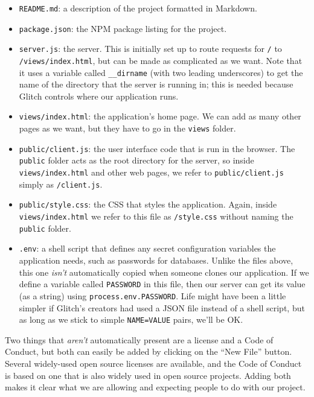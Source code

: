\begin{itemize}
\item
  \texttt{README.md}: a description of the project formatted in Markdown.
\item
  \texttt{package.json}: the NPM package listing for the project.
\item
  \texttt{server.js}: the server.
  This is initially set up to route requests for \texttt{/} to \texttt{/views/index.html},
  but can be made as complicated as we want.
  Note that it uses a variable called \texttt{\_\_dirname} (with two leading underscores)
  to get the name of the directory that the server is running in;
  this is needed because Glitch controls where our application runs.
\item
  \texttt{views/index.html}: the application's home page.
  We can add as many other pages as we want,
  but they have to go in the \texttt{views} folder.
\item
  \texttt{public/client.js}: the user interface code that is run in the browser.
  The \texttt{public} folder acts as the root directory for the server,
  so inside \texttt{views/index.html} and other web pages,
  we refer to \texttt{public/client.js} simply as \texttt{/client.js}.
\item
  \texttt{public/style.css}: the CSS that styles the application.
  Again,
  inside \texttt{views/index.html} we refer to this file as \texttt{/style.css}
  without naming the \texttt{public} folder.
\item
  \texttt{.env}: a shell script that defines any secret configuration variables the application needs,
  such as passwords for databases.
  Unlike the files above,
  this one \emph{isn't} automatically copied when someone clones our application.
  If we define a variable called \texttt{PASSWORD} in this file,
  then our server can get its value (as a string) using \texttt{process.env.PASSWORD}.
  Life might have been a little simpler if Glitch's creators had used a JSON file instead of a shell script,
  but as long as we stick to simple \texttt{NAME=VALUE} pairs,
  we'll be OK.
\end{itemize}

Two things that \emph{aren't} automatically present are a license and a Code of Conduct,
but both can easily be added by clicking on the ``New File'' button.
Several widely-used open source licenses are available,
and the Code of Conduct is based on one that is also widely used in open source projects.
Adding both makes it clear what we are allowing and expecting people to do with our project.

